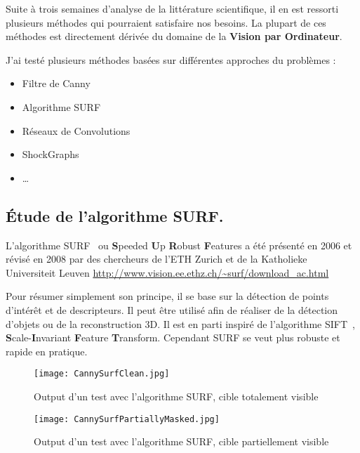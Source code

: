Suite à trois semaines d'analyse de la littérature scientifique, il en est ressorti plusieurs méthodes qui pourraient satisfaire nos besoins. La plupart de ces méthodes est directement dérivée du domaine de la \textbf{Vision par Ordinateur}.

J'ai testé plusieurs méthodes basées sur différentes approches du problèmes :
\begin{itemize}
	\item Filtre de Canny
	\item Algorithme SURF
	\item Réseaux de Convolutions
	\item ShockGraphs
	\item \ldots
\end{itemize}
\vspace{3mm}

\subsection{Étude de l'algorithme SURF.}

L'algorithme SURF~\cite{SURF} ou \textbf{S}peeded \textbf{U}p \textbf{R}obust \textbf{F}eatures a été présenté en 2006 et révisé en 2008 par des chercheurs de l'ETH Zurich et de la Katholieke Universiteit Leuven \url{http://www.vision.ee.ethz.ch/~surf/download_ac.html}

Pour résumer simplement son principe, il se base sur la détection de points d'intérêt et de descripteurs. Il peut être utilisé afin de réaliser de la détection d'objets ou de la reconstruction 3D. Il est en parti inspiré de l'algorithme SIFT~\cite{Lowe1999}, \textbf{S}cale-\textbf{I}nvariant \textbf{F}eature \textbf{T}ransform. Cependant SURF se veut plus robuste et rapide en pratique.

\begin{figure}[H]
    \centering
    \texttt{[image: CannySurfClean.jpg]}
	\caption{Output d'un test avec l'algorithme SURF, cible totalement visible} 
\end{figure}
\vspace{-6mm}

\begin{figure}[H]
    \centering
    \texttt{[image: CannySurfPartiallyMasked.jpg]}
	\caption{Output d'un test avec l'algorithme SURF, cible partiellement visible}\label{image.CannySurfPartiallyMasked} 
\end{figure}
\vspace{-6mm}

